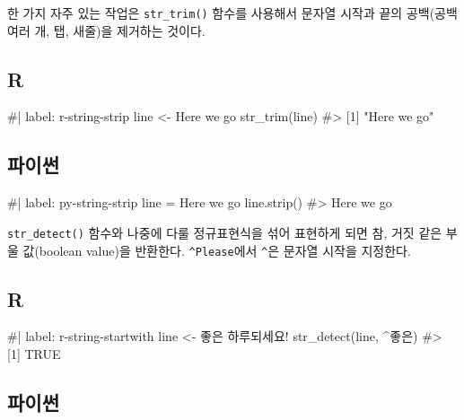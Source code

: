\documentclass[
  letterpaper,
]{book}
\newenvironment{Shaded}{\begin{snugshade}}{\end{snugshade}}
\newcommand{\NormalTok}[1]{\textcolor[rgb]{0.00,0.23,0.31}{#1}}
\begin{document}
한 가지 자주 있는 작업은 \texttt{str\_trim()} 함수를 사용해서 문자열
시작과 끝의 공백(공백 여러 개, 탭, 새줄)을 제거하는 것이다.

\subsection{R}

\begin{Shaded}
\begin{Highlighting}[]
\NormalTok{\#| label: r{-}string{-}strip}
\NormalTok{line \textless{}{-} \textquotesingle{}     Here we go \textquotesingle{}}
\NormalTok{str\_trim(line)}
\NormalTok{\#\textgreater{} [1] "Here we go"}
\end{Highlighting}
\end{Shaded}

\subsection{파이썬}

\begin{Shaded}
\begin{Highlighting}[]
\NormalTok{\#| label: py{-}string{-}strip}
\NormalTok{line = \textquotesingle{}     Here we go \textquotesingle{}}
\NormalTok{line.strip()}
\NormalTok{\#\textgreater{} \textquotesingle{}Here we go\textquotesingle{}}
\end{Highlighting}
\end{Shaded}

\texttt{str\_detect()} 함수와 나중에 다룰 정규표현식을 섞어 표현하게
되면 참, 거짓 같은 부울 값(boolean value)을 반환한다.
\texttt{\textquotesingle{}\^{}Please\textquotesingle{}}에서
\texttt{\^{}}은 문자열 시작을 지정한다.

\subsection{R}

\begin{Shaded}
\begin{Highlighting}[]
\NormalTok{\#| label: r{-}string{-}startwith}
\NormalTok{line \textless{}{-} \textquotesingle{}좋은 하루되세요!\textquotesingle{}}
\NormalTok{str\_detect(line, \textquotesingle{}\^{}좋은\textquotesingle{})}
\NormalTok{\#\textgreater{} [1] TRUE}
\end{Highlighting}
\end{Shaded}

\subsection{파이썬}
\end{document}
